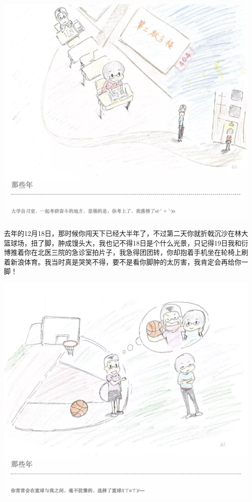 \documentclass[]{book}
\begin{document}
\includegraphics[width=8.33in]{images/wife2}

去年的12月18日，那时候你闯天下已经大半年了，不过第二天你就折戟沉沙在林大篮球场，扭了脚，肿成馒头大，我也记不得18日是个什么光景，只记得19日我和衍博推着你在北医三院的急诊室拍片子，我急得团团转，你却抱着手机坐在轮椅上刷着新浪体育。我当时真是哭笑不得，要不是看你脚肿的太厉害，我肯定会再给你一脚！

\includegraphics[width=8.33in]{images/wife3}
\end{document}
